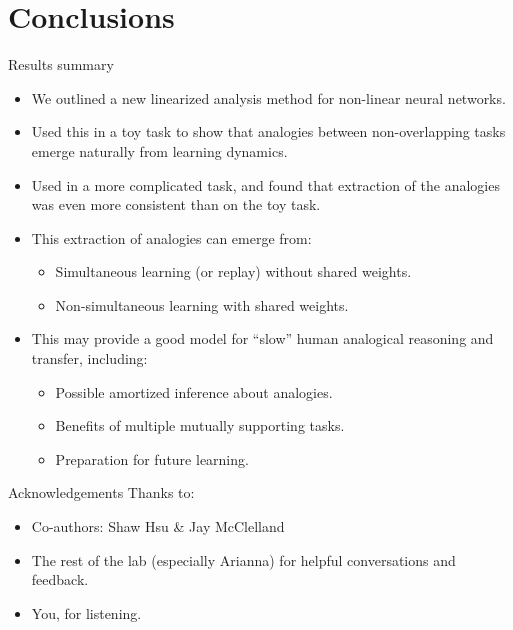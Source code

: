 \documentclass{beamer}
\begin{document}
\section{Conclusions}

\begin{frame}{Results summary}
\begin{itemize}
    \item<1-> We outlined a new linearized analysis method for non-linear neural networks. 
    \item<2-> Used this in a toy task to show that analogies between non-overlapping tasks emerge naturally from learning dynamics. 
    \item<3-> Used in a more complicated task, and found that extraction of the analogies was even more consistent than on the toy task. 
    \item<4-> This extraction of analogies can emerge from:
    \begin{itemize}
	\item<5-> Simultaneous learning (or replay) without shared weights. 
	\item<6-> Non-simultaneous learning with shared weights.
    \end{itemize}
    \item<7-> This may provide a good model for ``slow'' human analogical reasoning and transfer, including:
    \begin{itemize}
	\item<8-> Possible amortized inference about analogies.
	\item<9-> Benefits of multiple mutually supporting tasks.
	\item<10-> Preparation for future learning.
    \end{itemize}
\end{itemize}
\end{frame}

\begin{frame}{Acknowledgements}
Thanks to:
\begin{itemize}
    \item Co-authors: Shaw Hsu \& Jay McClelland
    \item The rest of the lab (especially Arianna) for helpful conversations and feedback. 
    \item You, for listening.
\end{itemize}
\end{frame}

\begin{frame}[allowframebreaks]


\end{frame}
\end{document}
